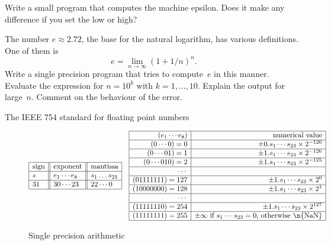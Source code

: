\begin{exercise}
  Write a small program that computes the machine epsilon. Does it
  make any difference if you set the
   low or high? 
\end{exercise}
\begin{exercise}
  The number $e\approx 2.72$, the base for the natural logarithm, has
  various definitions. One of them is 
  \[ e=\lim_{n\rightarrow\infty} (1+1/n)^n. \]
  Write a single precision program that tries to compute~$e$ in this
  manner. Evaluate the expression for $n=10^k$ with
  $k=1,\ldots,10$. Explain the output for large~$n$. Comment on the
  behaviour of the error.
\end{exercise}

 {The IEEE 754 standard for floating point numbers}
\label{sec:ieee754}

\begin{figure}
  \[
  \begin{array}{| l || l || l |}
    \hline
    \hbox{sign}&\hbox{exponent}&\hbox{mantissa}\\
    \hline
    s&e_1\cdots e_8&s_1\dots s_{23}\\
    \hline
    31&30\cdots 23&22\cdots 0\\
    \hline
  \end{array}\quad
  \begin{array}{|r|r|}
    \hline
    (e_1\cdots e_8)&\hbox{numerical value}\\
    \hline
    (0\cdots0)=0& \pm 0.s_1\cdots s_{23}\times 2^{-126}\\
    \hline
    (0\cdots 01)=1& \pm 1.s_1\cdots s_{23}\times 2^{-126}\\
    \hline
    (0\cdots 010)=2& \pm 1.s_1\cdots s_{23}\times 2^{-125}\\
    \hline
    \cdots&\\
    \hline
    (01111111)=127& \pm 1.s_1\cdots s_{23}\times 2^{0}\\
    \hline
    (10000000)=128& \pm 1.s_1\cdots s_{23}\times 2^{1}\\
    \hline
    \cdots&\\
    \hline
    (11111110)=254& \pm 1.s_1\cdots s_{23}\times 2^{127}\\
    \hline
    (11111111)=255& \hbox{$\pm\infty$ if $s_1\cdots s_{23}=0$, otherwise \n{NaN}} \\
    \hline
  \end{array}
  \]
  \caption{Single precision arithmetic}
  \label{fig:single-precision}
\end{figure}

